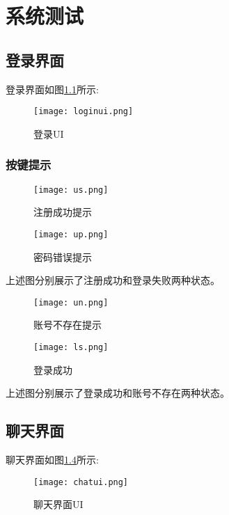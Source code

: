 \documentclass[forprint]{OSPaper}
\begin{document}
\chapter{系统测试}
\section{登录界面}
登录界面如图\ref{fig:13}所示:

\begin{figure}[ht]
	\centering
	\texttt{[image: loginui.png]}
	\caption{登录UI}
	\label{fig:13}
\end{figure}

\subsection{按键提示}


\begin{figure}[htbp]
	\begin{minipage}[t]{0.5\linewidth}
		\centering
		\label{fig:14}
		\texttt{[image: us.png]}
		\caption{注册成功提示}
	\end{minipage}
	\begin{minipage}[t]{0.5\linewidth}
	\centering
	\label{fig:15}
	\texttt{[image: up.png]}
	\caption{密码错误提示}
\end{minipage}
\end{figure}

上述图分别展示了注册成功和登录失败两种状态。


\begin{figure}[htbp]
	\begin{minipage}[t]{0.45\linewidth}
	\centering
	\label{fig:16}
	\texttt{[image: un.png]}
	\caption{账号不存在提示}
	\end{minipage}%
	\begin{minipage}[t]{0.45\linewidth}
	\centering
	\label{fig:17}
	\texttt{[image: ls.png]}
	\caption{登录成功}
\end{minipage}%
\end{figure}
上述图分别展示了登录成功和账号不存在两种状态。
\section{聊天界面}
聊天界面如图\ref{fig:18}所示:
\begin{figure}[ht]
	\centering
	\texttt{[image: chatui.png]}
	\caption{聊天界面UI}
	\label{fig:18}
\end{figure}
\end{document}
